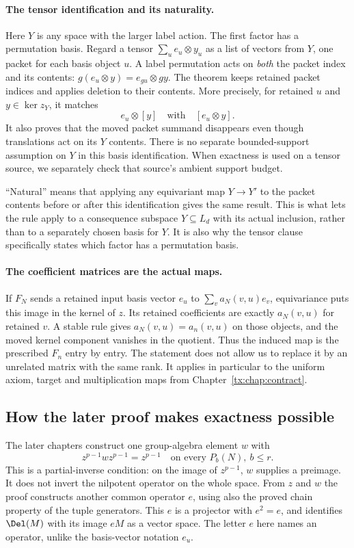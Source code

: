 \documentclass[11pt,a4paper,oneside,openany]{book}
\theoremstyle{definition}\newtheorem{definition}[theorem]{Definition}
\theoremstyle{remark}\newtheorem{remark}[theorem]{Remark}
\numberwithin{equation}{chapter}
\begin{document}
\paragraph{The tensor identification and its naturality.}
Here $Y$ is any space with the larger label action. The first
factor has a permutation basis. Regard a tensor
$\sum_u e_u\otimes y_u$ as a list of vectors from $Y$, one
packet for each basis object $u$. A label permutation acts on
\emph{both} the packet index and its contents:
$g(e_u\otimes y)=e_{gu}\otimes gy$.
The theorem keeps retained packet indices and applies deletion
to their contents. More precisely, for retained $u$ and
$y\in\ker z_Y$, it matches
\[
                         e_u\otimes[y]\quad\text{with}\quad[e_u\otimes y].
\]
It also proves that the moved packet summand disappears even
though translations act on its $Y$ contents. There is no separate
bounded-support assumption on $Y$ in this basis identification.
When exactness is used on a tensor source, we separately check
that source's ambient support budget.

``Natural'' means that applying any equivariant map $Y\to Y'$
to the packet contents before or after this identification gives
the same result. This is what lets the rule apply to a consequence
subspace $Y\subseteq L_d$ with its actual inclusion, rather than
to a separately chosen basis for $Y$. It is also why the tensor
clause specifically states which factor has a permutation basis.

\paragraph{The coefficient matrices are the actual maps.}
If $F_N$ sends a retained input basis vector $e_u$ to
$\sum_v a_N(v,u)e_v$, equivariance puts this image in the kernel
of $z$. Its retained coefficients are exactly $a_N(v,u)$ for
retained $v$. A stable rule gives $a_N(v,u)=a_n(v,u)$ on those
objects, and the moved kernel component vanishes in the quotient.
Thus the induced map is the prescribed $F_n$ entry by entry.
The statement does not allow us to replace it by an unrelated
matrix with the same rank. It applies in particular to the
uniform axiom, target and multiplication maps from Chapter~\ref{tx:chap:contract}.

\subsection*{How the later proof makes exactness possible}
The later chapters construct one group-algebra element $w$ with
\[
             z^{p-1}wz^{p-1}=z^{p-1}
                           \quad\text{on every }P_b(N),\ b\le r.
\]
This is a partial-inverse condition: on the image of $z^{p-1}$,
$w$ supplies a preimage. It does not invert the nilpotent operator
on the whole space. From $z$ and $w$ the proof constructs another
common operator $e$, using also the proved chain property of the
tuple generators. This $e$ is a projector with $e^2=e$, and identifies
$\Del(M)$ with its image $eM$ as a vector space. The letter $e$
here names an operator, unlike the basis-vector notation $e_u$.
\end{document}
